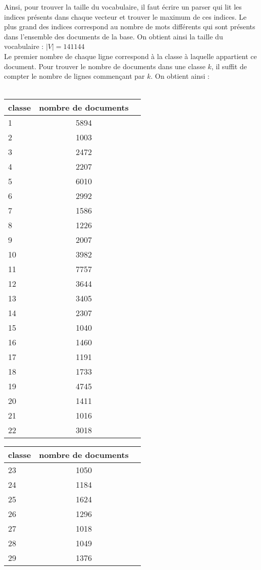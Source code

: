 \documentclass[a4paper, 12pt]{article}
\begin{document}
\begin{enumerate}
Ainsi, pour trouver la taille du vocabulaire, il faut écrire un parser qui lit les indices présents dans chaque vecteur et trouver le maximum de ces indices. Le plus grand des indices correspond au nombre de mots différents qui sont présents dans l'ensemble des documents de la base. On obtient ainsi la taille du vocabulaire : 
\begin{math}|V| = 141144 \end{math}
\\
Le premier nombre de chaque ligne correspond à la classe à laquelle appartient ce document. Pour trouver le nombre de documents dans une classe $k$, il suffit de compter le nombre de lignes commençant par $k$. On obtient ainsi : 
\\
\\
\begin{center}
\begin{tabular}{|l|c|r|}
	\hline
   classe & nombre de documents \\
   \hline
   1 & 5894 \\
   \hline
   2 & 1003 \\
   \hline
   3 & 2472 \\
   \hline
   4 & 2207 \\
   \hline
   5 & 6010 \\
   \hline
   6 & 2992 \\
   \hline
   7 & 1586 \\
   \hline
   8 & 1226 \\
   \hline
   9 & 2007 \\
   \hline
   10 & 3982 \\
   \hline
   11 & 7757 \\
   \hline
   12 & 3644 \\
   \hline
   13 & 3405 \\
   \hline
   14 & 2307 \\
   \hline
   15 & 1040 \\
   \hline
   16 & 1460 \\
   \hline
   17 & 1191 \\
   \hline
   18 & 1733 \\
   \hline
   19 & 4745 \\
   \hline
   20 & 1411 \\
   \hline
   21 & 1016 \\
   \hline
   22 & 3018 \\
   \hline
    \end{tabular}
   
  \begin{tabular}{|l|c|r|}
  \hline
  classe & nombre de documents \\
  \hline
   23 & 1050 \\
   \hline
   24 & 1184 \\
   \hline
   25 & 1624 \\
   \hline
   26 & 1296 \\
   \hline
   27 & 1018 \\
   \hline
   28 & 1049 \\
   \hline
   29 & 1376 \\
   \hline
\end{tabular}
\end{center}



\end{enumerate}
\end{document}
